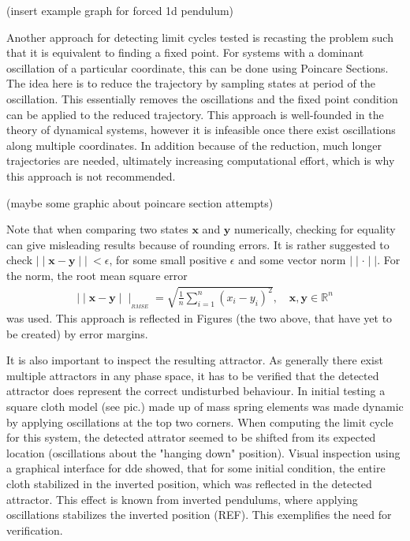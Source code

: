 (insert example graph for forced 1d pendulum)

Another approach for detecting limit cycles tested is recasting the problem such that it is equivalent to finding a fixed point. For systems with a dominant oscillation of a particular coordinate, this can be done using Poincare Sections. The idea here is to reduce the trajectory by sampling states at period of the oscillation. This essentially removes the oscillations and the fixed point condition can be applied to the reduced trajectory. This approach is well-founded in the theory of dynamical systems, however it is infeasible once there exist oscillations along multiple coordinates. In addition because of the reduction, much longer trajectories are needed, ultimately increasing computational effort, which is why this approach is not recommended. 

(maybe some graphic about poincare section attempts)

Note that when comparing two states $\mathbf{x}$ and $\mathbf{y}$ numerically, checking for equality can give misleading results because of rounding errors. It is rather suggested to check $\mid\mid \mathbf{x} - \mathbf{y} \mid\mid\ < \epsilon$, for some small positive $\epsilon$ and some vector norm $\mid\mid\cdot\mid\mid$. For the norm, the root mean square error \begin{gather}\mid\mid \mathbf{x} - \mathbf{y} \mid\mid_{_{RMSE}} = \sqrt{\frac{1}{n}\sum_{i=1}^{n}(x_i-y_i)^2},\quad \mathbf{x},\mathbf{y} \in \mathbb{R}^n\end{gather}was used. This approach is reflected in Figures (the two above, that have yet to be created) by error margins. 

It is also important to inspect the resulting attractor. As generally there exist multiple attractors in any phase space, it has to be verified that the detected attractor does represent the correct undisturbed behaviour. In initial testing a square cloth model (see pic.) made up of mass spring elements was made dynamic by applying oscillations at the top two corners. When computing the limit cycle for this system, the detected attrator seemed to be shifted from its expected location (oscillations about the "hanging down" position). Visual inspection using a graphical interface for dde showed, that for some initial condition, the entire cloth stabilized in the inverted position, which was reflected in the detected attractor. This effect is known from inverted pendulums, where applying oscillations stabilizes the inverted position (REF). This exemplifies the need for verification.  

